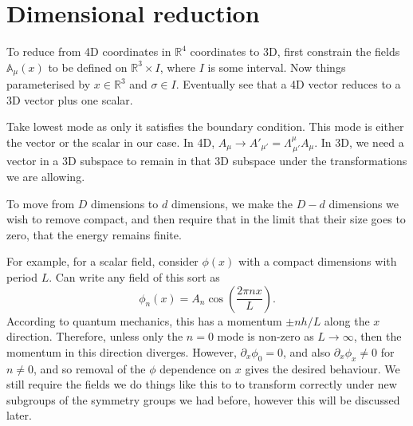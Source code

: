 \documentclass{article}
\begin{document}
\section{Dimensional reduction}
To reduce from 4D coordinates in $\mathbb{R}^{4}$ coordinates to 3D, first constrain the fields $\mathbb{A}_{\mu}(x)$ to be defined on $\mathbb{R}^{3}\times I$, where $I$ is some interval. Now things parameterised by $x\in \mathbb{R}^{3}$ and $\sigma\in I$. Eventually see that a 4D vector reduces to a 3D vector plus one scalar. \newline 

\noindent Take lowest mode as only it satisfies the boundary condition. This mode is either the vector or the scalar in our case. In 4D, $A_{\mu} \rightarrow A'_{\mu'} = \Lambda^{\mu}_{\,\mu '}A_{\mu}$. In 3D, we need a vector in a 3D subspace to remain in that 3D subspace under the transformations we are allowing.\newline


\noindent To move from $D$ dimensions to $d$ dimensions, we make the $D-d$ dimensions we wish to remove compact, and then require that in the limit that their size goes to zero, that the energy remains finite. \newline

\noindent For example, for a scalar field, consider $\phi\left(x\right)$ with a compact dimensions with period $L$. Can write any field of this sort as
\begin{equation}
    \phi_{n}\left(x\right) = A_{n}\cos\left(\frac{2\pi n x}{L}\right).
\end{equation}
According to quantum mechanics, this has a momentum $\pm nh/L$ along the $x$ direction. Therefore, unless only the $n=0$ mode is non-zero as $L\rightarrow \infty$, then the momentum in this direction diverges. However, $\partial_{x}\phi_{0}=0$, and also $\partial_{x}\phi_{x}\neq 0$ for $n\neq 0$, and so removal of the $\phi$ dependence on $x$ gives the desired behaviour. We still require the fields we do things like this to to transform correctly under new subgroups of the symmetry groups we had before, however this will be discussed later. \newline
\end{document}
